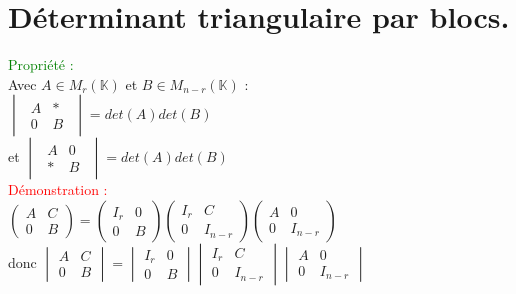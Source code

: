 \documentclass{article}
\begin{document}
\section{Déterminant triangulaire par blocs.}
\textcolor{green}{Propriété :} \\
  Avec $A \in M_{r} (\mathbb K)$ et $B \in M_{n-r}(\mathbb K)$ : \\
  $\begin{vmatrix} \begin{array}{l|r}
A & \ast \\ \hline  0 & B \end{array} \end{vmatrix}=det(A) det(B)$ \\
  et $\begin{vmatrix} \begin{array}{l|r}
A & 0 \\ \hline \ast & B \end{array} \end{vmatrix}=det(A) det(B)$ \\
  \textcolor{red}{Démonstration :} \\
  $\begin{pmatrix} A & C \\ 0 & B \end{pmatrix}= \begin{pmatrix} I_r & 0 \\ 0 & B \end{pmatrix} \begin{pmatrix} I_r & C \\ 0 & I_{n-r} \end{pmatrix}\begin{pmatrix} A & 0 \\ 0 & I_{n-r} \end{pmatrix} $ \\
  donc $\begin{vmatrix} A & C \\ 0 & B \end{vmatrix}= \begin{vmatrix} I_r & 0 \\ 0 & B \end{vmatrix} \begin{vmatrix} I_r & C \\ 0 & I_{n-r} \end{vmatrix}\begin{vmatrix} A & 0 \\ 0 & I_{n-r} \end{vmatrix} $ \\
\end{document}
